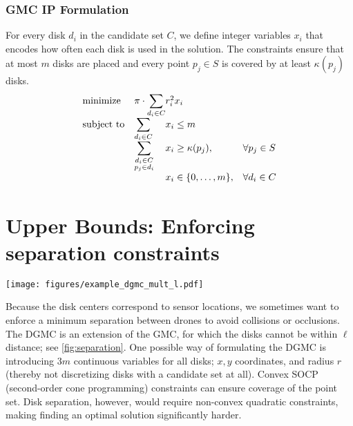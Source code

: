 \documentclass[letterpaper, 10 pt, conference]{ieeeconf}
\newcommand{\points}{S}
\newcommand{\point}{p}
\newcommand{\largeFixM}{\emph{uni\_lg}}
\newcommand{\gmcip}{GMC IP}
\begin{document}
\subsubsection{\gmcip{} Formulation}\label{section:ip-formulation}

For every disk $d_i$ in the candidate set $C$, we define integer variables $x_i$ that encodes how often each disk is used in the solution.
The constraints ensure that at most $m$ disks are placed and every point $\point_j\in \points$ is covered by at least $\kappa(\point_j)$ disks.
\begin{equation*}
    \begin{array}{ll@{}ll}
        \text{minimize}  & \displaystyle \pi \cdot \sum\limits_{d_i\in C} &r_{i}^2x_{i} &\\
        \text{subject to}& \displaystyle\sum_{d_i\in C}  &  x_{i} \leq m&\\
                         & \displaystyle\sum_{\substack{d_i\in C\\ \point_j \in d_i}}   &x_{i} \geq \kappa(\point_j),  & \forall \point_j \in \points\\
                         &&x_{i} \in \{0, \dots ,m\}, & \forall d_i \in C
    \end{array}
\end{equation*}

\section{Upper Bounds: Enforcing separation constraints}\label{sec:UB}

\begin{figure*}[t]
    \centering
    \texttt{[image: figures/example\_dgmc\_mult\_l.pdf]}
    \caption{\label{fig:separation}
         Solutions from \largeFixM{} for the DGMC with different separation constraints; $\ell=0,5,10$, $n=40$ and $m=30$.
    }
\end{figure*}

Because the disk centers correspond to sensor locations,
we sometimes want to enforce a minimum separation between drones to avoid collisions or occlusions.
The DGMC is an extension of the GMC, for which the disks cannot be within $\ell$ distance; see \cref{fig:separation}.
One possible way of formulating the DGMC is introducing $3m$ continuous variables for all disks; $x,y$ coordinates, and radius $r$ (thereby not discretizing disks with a candidate set at all).
Convex SOCP (second-order cone programming) constraints can ensure coverage of the point set.
Disk separation, however, would require non-convex quadratic constraints, making finding an optimal solution significantly harder. 
\end{document}
